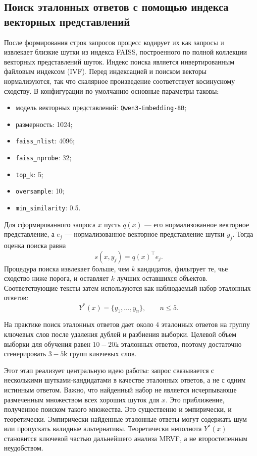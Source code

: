 \subsection{Поиск эталонных ответов с помощью индекса векторных представлений}

После формирования строк запросов процесс кодирует их как запросы и извлекает близкие шутки из индекса FAISS, построенного по полной коллекции векторных представлений шуток. Индекс поиска является инвертированным файловым индексом (IVF). Перед индексацией и поиском векторы нормализуются, так что скалярное произведение соответствует косинусному сходству. В конфигурации по умолчанию основные параметры таковы:
\begin{itemize}
 \item модель векторных представлений: \texttt{Qwen3-Embedding-8B};
 \item размерность: 1024;
 \item \texttt{faiss\_nlist}: 4096;
 \item \texttt{faiss\_nprobe}: 32;
 \item \texttt{top\_k}: 5;
 \item \texttt{oversample}: 10;
 \item \texttt{min\_similarity}: 0.5.
\end{itemize}

Для сформированного запроса \(x\) пусть \(q(x)\) --- его нормализованное векторное представление, а \(e_j\) --- нормализованное векторное представление шутки \(y_j\). Тогда оценка поиска равна
\[
 s(x,y_j)=q(x)^\top e_j.
\]
Процедура поиска извлекает больше, чем \(k\) кандидатов, фильтрует те, чье сходство ниже порога, и оставляет \(k\) лучших оставшихся объектов. Соответствующие тексты затем используются как наблюдаемый набор эталонных ответов:
\[
 Y^{*}(x)=\{y_1,\dots,y_n\}, \qquad n \le 5.
\]

На практике поиск эталонных ответов дает около \(4\) эталонных ответов на группу ключевых слов после удаления дублей и разбиения выборки. Целевой объем выборки для обучения равен \(10-20\text{k}\) эталонных ответов, поэтому достаточно сгенерировать \(3-5\text{k}\) групп ключевых слов.

Этот этап реализует центральную идею работы: запрос связывается с несколькими шутками-кандидатами в качестве эталонных ответов, а не с одним истинным ответом. Важно, что найденный набор не является исчерпывающе размеченным множеством всех хороших шуток для \(x\). Это приближение, полученное поиском такого множества. Это существенно и эмпирически, и теоретически. Эмпирически найденные эталонные ответы могут содержать шум или пропускать валидные альтернативы. Теоретически неполнота \(Y^{*}(x)\) становится ключевой частью дальнейшего анализа MRVF, а не второстепенным неудобством.


